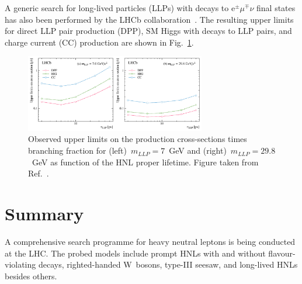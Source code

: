 \documentclass[a4paper,11pt]{article}
\begin{document}
A generic search for long-lived particles (LLPs) with decays to $\textrm{e}^{\pm}\mu^{\mp}\nu$ final states has also been performed by the LHCb collaboration~\cite{LHCb-PAPER-2020-027}. The resulting upper limits for direct LLP pair production (DPP), SM Higgs with decays to LLP pairs, and charge current (CC) production are shown in Fig.~\ref{fig:LHCb-PAPER-2020-027}.

\begin{figure}[htbp]
\begin{center}
\includegraphics[width=0.7\textwidth]{LHCb-PAPER-2020-027.pdf}
\caption{\label{fig:LHCb-PAPER-2020-027}Observed upper limits on the production cross-sections times branching fraction for (left)~$m_{LLP}=7$~GeV and (right)~$m_{LLP}=29.8$~GeV as function of the HNL proper lifetime. Figure taken from Ref.~\cite{LHCb-PAPER-2020-027}.}
\end{center}
\end{figure}

\section{Summary}
A comprehensive search programme for heavy neutral leptons is being conducted at the LHC. The probed models include prompt HNLs with and without flavour-violating decays, righted-handed W~bosons, type-III seesaw, and long-lived HNLs besides others.
\end{document}
